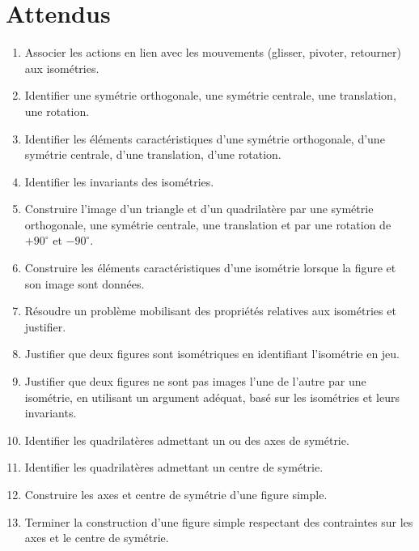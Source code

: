 \documentclass[../../syllabus_1.tex]{subfiles}
\begin{document}
\section*{Attendus}
\begin{enumerate}[label=\textbf{\arabic*.}]
    \item Associer les actions en lien avec les mouvements (glisser, pivoter, retourner) aux isométries.
    \item Identifier une symétrie orthogonale, une symétrie centrale, une translation, une rotation.
    \item Identifier les éléments caractéristiques d'une symétrie orthogonale, d'une symétrie centrale, d'une translation, d'une rotation.
    \item Identifier les invariants des isométries.
    \item Construire l'image d'un triangle et d'un quadrilatère par une symétrie orthogonale, une symétrie centrale, une translation et par une rotation de $+ 90^\circ $ et $- 90^\circ $.
    \item Construire les éléments caractéristiques d'une isométrie lorsque la figure et son image sont données.
    \item Résoudre un problème mobilisant des propriétés relatives aux isométries et justifier.
    \item Justifier que deux figures sont isométriques en identifiant l'isométrie en jeu.
    \item Justifier que deux figures ne sont pas images l'une de l'autre par une isométrie, en utilisant un argument adéquat, basé sur les isométries et leurs invariants.
    \item Identifier les quadrilatères admettant un ou des axes de symétrie.
    \item Identifier les quadrilatères admettant un centre de symétrie.
    \item Construire les axes et centre de symétrie d'une figure simple.
    \item Terminer la construction d'une figure simple respectant des contraintes sur les axes et le centre de symétrie.
\end{enumerate}
\end{document}
